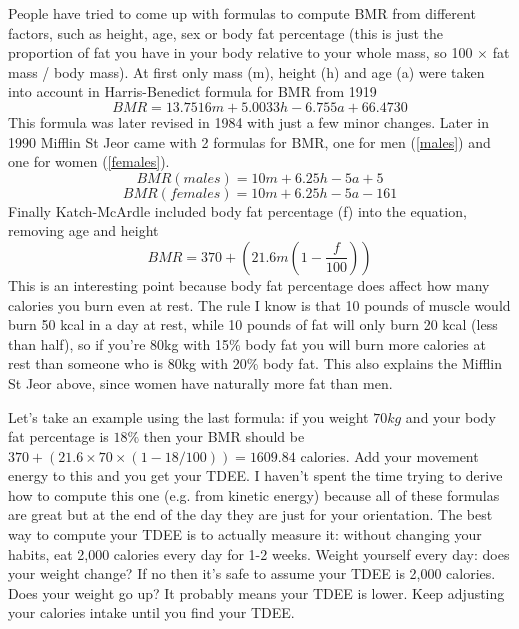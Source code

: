 \documentclass[openany, 12pt]{book}
\begin{document}
	People have tried to come up with formulas to compute BMR from different factors, such as height, age, sex or body fat percentage (this is just
	the proportion of fat you have in your body relative to your whole mass, so 100 $\times$ fat mass / body mass). At first only mass (m), height (h) 
	and age (a) were taken into account in Harris-Benedict formula for BMR from 1919
	\begin{equation}
		BMR = 13.7516m + 5.0033h - 6.755a + 66.4730
	\end{equation}
  	This formula was later revised in 1984 with just a few minor changes. Later in 1990 Mifflin St Jeor
        came with 2 formulas for BMR, one for men (\ref{males}) and one for women (\ref{females}).
	\begin{equation}
		\label{males}
		BMR (males) = 10m + 6.25h - 5a + 5
	\end{equation}
	\begin{equation}
		\label{females}
		BMR (females) = 10m + 6.25h - 5a - 161
	\end{equation}
	Finally Katch-McArdle
        included body fat percentage (f) into the equation, removing age and height
	\begin{equation}
		BMR = 370 + (21.6m (1 - \frac{f}{100}))
	\end{equation}
	This is an interesting point because body fat percentage does affect how many calories you burn even at rest. The rule I know is that 10 pounds of muscle would burn 50 kcal in a day at rest,
        while 10 pounds of fat will only burn 20 kcal (less than half),
        so if you're 80kg with 15\% body fat you will burn more calories at rest than someone who is 80kg with 20\% body fat. This also explains the Mifflin St Jeor above, since women have naturally
        more fat than men.
	
	Let's take an example using the last formula: if you weight $70kg$ and your body fat percentage is $18\%$ then your BMR should be $370 + (21.6 \times 70 \times (1 - 18/100)) = 1609.84$ calories.
        Add your movement energy to this and you get your TDEE. I haven't spent the time trying to derive how to
	compute this one (e.g. from kinetic energy) because all of these formulas are great but at the end of the day they are just for your orientation.
	The best way to compute your TDEE is to actually measure it: without changing your habits, eat 2,000 calories every day for 1-2 weeks. Weight
	yourself every day: does your weight change? If no then it's safe to assume your TDEE is 2,000 calories. Does your weight go up? It probably means
	your TDEE is lower. Keep adjusting your calories intake until you find your TDEE. 
	
\end{document}
